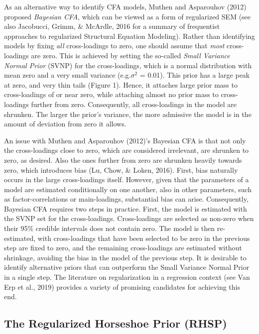\documentclass[
  man,floatsintext]{apa6}
\begin{document}
As an alternative way to identify CFA models, Muthen and Asparouhov (2012) proposed \emph{Bayesian CFA}, which can be viewed as a form of regularized SEM (see also Jacobucci, Grimm, \& McArdle, 2016 for a summary of frequentist approaches to regularized Structural Equation Modeling). Rather than identifying models by fixing \emph{all} cross-loadings to zero, one should assume that \emph{most} cross-loadings are zero. This is achieved by setting the so-called \emph{Small Variance Normal Prior} (SVNP) for the cross-loadings, which is a normal distribution with mean zero and a very small variance (e.g.\(\sigma^2\) = 0.01). This prior has a large peak at zero, and very thin tails (Figure 1). Hence, it attaches large prior mass to cross-loadings of or near zero, while attaching almost no prior mass to cross-loadings further from zero. Consequently, all cross-loadings in the model are shrunken. The larger the prior's variance, the more admissive the model is in the amount of deviation from zero it allows.

An issue with Muthen and Asparouhov (2012)'s Bayesian CFA is that not only the cross-loadings close to zero, which are considered irrelevant, are shrunken to zero, as desired. Also the ones further from zero are shrunken heavily towards zero, which introduces bias (Lu, Chow, \& Loken, 2016). First, bias naturally occurs in the large cross-loadings itself. However, given that the parameters of a model are estimated conditionally on one another, also in other parameters, such as factor-correlations or main-loadings, substantial bias can arise. Consequently, Bayesian CFA requires two steps in practice. First, the model is estimated with the SVNP set for the cross-loadings. Cross-loadings are selected as non-zero when their 95\% credible intervals does not contain zero. The model is then re-estimated, with cross-loadings that have been selected to be zero in the previous step are fixed to zero, and the remaining cross-loadings are estimated without shrinkage, avoiding the bias in the model of the previous step. It is desirable to identify alternative priors that can outperform the Small Variance Normal Prior in a single step. The literature on regularization in a regression context (see Van Erp et al., 2019) provides a variety of promising candidates for achieving this end.

\hypertarget{the-regularized-horseshoe-prior-rhsp}{%
\subsection{The Regularized Horseshoe Prior (RHSP)}\label{the-regularized-horseshoe-prior-rhsp}}
\end{document}
